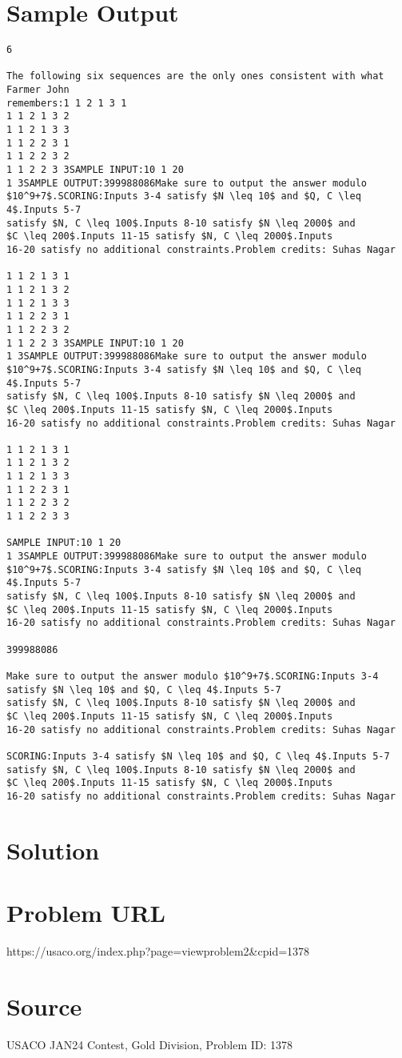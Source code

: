 \documentclass[12pt]{article}
\begin{document}
\section*{Sample Output}
\begin{verbatim}
6

The following six sequences are the only ones consistent with what Farmer John
remembers:1 1 2 1 3 1
1 1 2 1 3 2
1 1 2 1 3 3
1 1 2 2 3 1
1 1 2 2 3 2
1 1 2 2 3 3SAMPLE INPUT:10 1 20
1 3SAMPLE OUTPUT:399988086Make sure to output the answer modulo $10^9+7$.SCORING:Inputs 3-4 satisfy $N \leq 10$ and $Q, C \leq 4$.Inputs 5-7
satisfy $N, C \leq 100$.Inputs 8-10 satisfy $N \leq 2000$ and
$C \leq 200$.Inputs 11-15 satisfy $N, C \leq 2000$.Inputs
16-20 satisfy no additional constraints.Problem credits: Suhas Nagar

1 1 2 1 3 1
1 1 2 1 3 2
1 1 2 1 3 3
1 1 2 2 3 1
1 1 2 2 3 2
1 1 2 2 3 3SAMPLE INPUT:10 1 20
1 3SAMPLE OUTPUT:399988086Make sure to output the answer modulo $10^9+7$.SCORING:Inputs 3-4 satisfy $N \leq 10$ and $Q, C \leq 4$.Inputs 5-7
satisfy $N, C \leq 100$.Inputs 8-10 satisfy $N \leq 2000$ and
$C \leq 200$.Inputs 11-15 satisfy $N, C \leq 2000$.Inputs
16-20 satisfy no additional constraints.Problem credits: Suhas Nagar

1 1 2 1 3 1
1 1 2 1 3 2
1 1 2 1 3 3
1 1 2 2 3 1
1 1 2 2 3 2
1 1 2 2 3 3

SAMPLE INPUT:10 1 20
1 3SAMPLE OUTPUT:399988086Make sure to output the answer modulo $10^9+7$.SCORING:Inputs 3-4 satisfy $N \leq 10$ and $Q, C \leq 4$.Inputs 5-7
satisfy $N, C \leq 100$.Inputs 8-10 satisfy $N \leq 2000$ and
$C \leq 200$.Inputs 11-15 satisfy $N, C \leq 2000$.Inputs
16-20 satisfy no additional constraints.Problem credits: Suhas Nagar

399988086

Make sure to output the answer modulo $10^9+7$.SCORING:Inputs 3-4 satisfy $N \leq 10$ and $Q, C \leq 4$.Inputs 5-7
satisfy $N, C \leq 100$.Inputs 8-10 satisfy $N \leq 2000$ and
$C \leq 200$.Inputs 11-15 satisfy $N, C \leq 2000$.Inputs
16-20 satisfy no additional constraints.Problem credits: Suhas Nagar

SCORING:Inputs 3-4 satisfy $N \leq 10$ and $Q, C \leq 4$.Inputs 5-7
satisfy $N, C \leq 100$.Inputs 8-10 satisfy $N \leq 2000$ and
$C \leq 200$.Inputs 11-15 satisfy $N, C \leq 2000$.Inputs
16-20 satisfy no additional constraints.Problem credits: Suhas Nagar
\end{verbatim}

\section*{Solution}


\section*{Problem URL}
https://usaco.org/index.php?page=viewproblem2&cpid=1378

\section*{Source}
USACO JAN24 Contest, Gold Division, Problem ID: 1378
\end{document}
